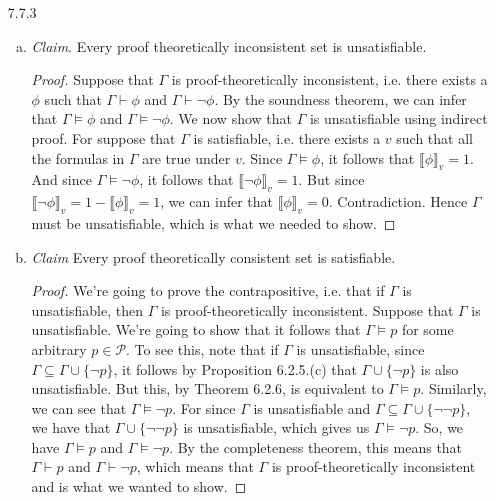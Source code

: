 	\begin{enumerate}
	
	
		\item[7.7.3] \begin{enumerate}[(a)]
		
			\item \emph{Claim}. Every proof theoretically inconsistent set is unsatisfiable. 
			
			\begin{proof}
			Suppose that $\Gamma$ is proof-theoretically inconsistent, i.e. there exists a $\phi$ such that $\Gamma\vdash\phi$ and $\Gamma\vdash\neg\phi$. By the soundness theorem, we can infer that $\Gamma\vDash\phi$ and $\Gamma\vDash\neg\phi$. We now show that $\Gamma$ is unsatisfiable using indirect proof. For suppose that $\Gamma$ is satisfiable, i.e. there exists a $v$ such that all the formulas in $\Gamma$ are true under $v$. Since  $\Gamma\vDash\phi$, it follows that $\llbracket\phi\rrbracket_v=1$. And since $\Gamma\vDash\neg\phi$, it follows that $\llbracket\neg\phi\rrbracket_v=1$. But since $\llbracket\neg\phi\rrbracket_v=1-\llbracket\phi\rrbracket_v=1$, we can infer that $\llbracket\phi\rrbracket_v=0$. Contradiction. Hence $\Gamma$ must be unsatisfiable, which is what we needed to show.
			\end{proof}
			
			\item \emph{Claim} Every proof theoretically consistent set is satisfiable. 
			
			\begin{proof}
			We're going to prove the contrapositive, i.e. that if $\Gamma$ is unsatisfiable, then $\Gamma$ is proof-theoretically inconsistent. Suppose that $\Gamma$ is unsatisfiable. We're going to show that it follows that $\Gamma\vDash p$ for some arbitrary $p\in\mathcal{P}$. To see this, note that if $\Gamma$ is unsatisfiable, since $\Gamma\subseteq \Gamma\cup\{\neg p\}$, it follows by Proposition 6.2.5.(c) that $\Gamma\cup\{\neg p\}$ is also unsatisfiable. But this, by Theorem 6.2.6, is equivalent to $\Gamma\vDash p$. Similarly, we can see that $\Gamma\vDash\neg p$. For since $\Gamma$ is unsatisfiable and $\Gamma\subseteq\Gamma\cup\{\neg\neg p\}$, we have that $\Gamma\cup\{\neg\neg p\}$ is unsatisfiable, which gives us $\Gamma\vDash\neg p$. So, we have $\Gamma\vDash p$ and $\Gamma\vDash\neg p$. By the completeness theorem, this means that $\Gamma\vdash p$ and $\Gamma\vdash\neg p$, which means that $\Gamma$ is proof-theoretically inconsistent and is what we wanted to show.
			\end{proof}
		
		\end{enumerate}
	
	\end{enumerate}
	

